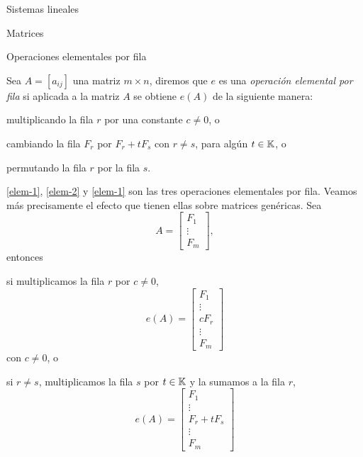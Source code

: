 \begin{chapter}{Sistemas lineales}
\begin{section}{Matrices}
\begin{subsection}{Operaciones elementales por fila}
                \begin{definicion}
                    Sea $A = [a_{ij}]$ una matriz $m \times  n$, diremos que $e$ es una  \textit{operación elemental por fila} si aplicada a la matriz $A$ se obtiene  $e(A)$ de la siguiente manera:
                    \begin{enumelem}
                        \item\label{elem-1} multiplicando la fila $r$ por una constante $c\not=0$, o
                        \item\label{elem-2} cambiando la fila $F_r$ por $F_r + tF_s$ con $r\not=s$, para algún $t \in \K$, o
                        \item\label{elem-3} permutando la fila $r$ por la fila $s$.   
                    \end{enumelem}
                    \ref{elem-1}, \ref{elem-2} y \ref{elem-1} son las tres operaciones elementales por fila. Veamos más precisamente  el efecto que tienen ellas sobre matrices genéricas. Sea 
                    \begin{equation*}
                    A = \begin{bmatrix} 
                    F_1 \\  \vdots \\	F_m
                    \end{bmatrix},
                    \end{equation*} entonces 
                    \begin{enumelem}
                        \item si multiplicamos la fila $r$ por $c \not=0$, 
                        $$ e(A) = \begin{bmatrix} 
                        F_1 \\ 	\vdots \\ cF_r \\ \vdots \\	F_m
                        \end{bmatrix} $$ con $c \not=0$, o
                        \item si $r\not=s$, multiplicamos la fila $s$ por  $t \in \K$ y la sumamos a la fila $r$, 
                        $$ e(A)= \begin{bmatrix} 
                        F_1 \\  \vdots \\ F_r + t F_s\\ \vdots \\	F_m

\end{bmatrix}$$
\end{enumelem}
\end{definicion}
\end{subsection}
\end{section}
\end{chapter}
